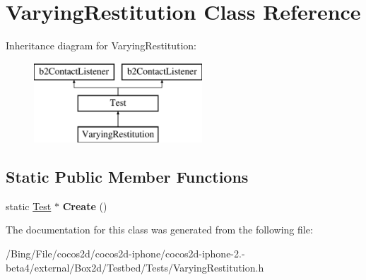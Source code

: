 \hypertarget{class_varying_restitution}{\section{Varying\-Restitution Class Reference}
\label{class_varying_restitution}
}
Inheritance diagram for Varying\-Restitution\-:\begin{figure}[H]
\begin{center}
\leavevmode
\includegraphics[height=3.000000cm]{class_varying_restitution}
\end{center}
\end{figure}
\subsection*{Static Public Member Functions}
\begin{DoxyCompactItemize}
\item 
\hypertarget{class_varying_restitution_a9ddffc4d8b33152c2bc8abbdc7db4b6e}{static \hyperlink{class_test}{Test} $\ast$ {\bfseries Create} ()}\label{class_varying_restitution_a9ddffc4d8b33152c2bc8abbdc7db4b6e}

\end{DoxyCompactItemize}


The documentation for this class was generated from the following file\-:\begin{DoxyCompactItemize}
\item 
/\-Bing/\-File/cocos2d/cocos2d-\/iphone/cocos2d-\/iphone-\/2.-\/beta4/external/\-Box2d/\-Testbed/\-Tests/Varying\-Restitution.\-h\end{DoxyCompactItemize}
